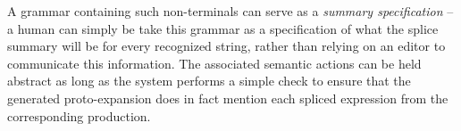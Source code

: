 \documentclass[acmsmall,10pt,review,anonymous]{acmart}\settopmatter{printfolios=true}
\begin{document}
A grammar containing such non-terminals can serve as a \emph{summary specification} -- a human can simply be take this grammar as a specification of what the splice summary will be for every recognized string, rather than relying on an editor to communicate this information. The associated semantic actions can be held abstract as long as the system performs a simple check to ensure that the generated proto-expansion does in fact mention each spliced expression from the corresponding production.



\end{document}
